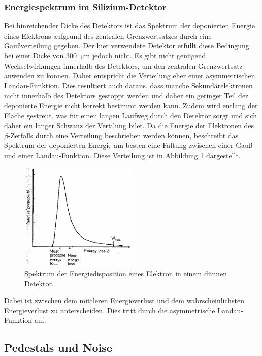 \subsubsection{Energiespektrum im Silizium-Detektor}
Bei hinreichender Dicke des Detektors ist das Spektrum der deponierten Energie eines
Elektrons aufgrund des zentralen Grenzwertsatzes durch eine Gaußverteilung gegeben.
Der hier verwendete Detektor erfüllt diese Bedingung bei einer Dicke von
\SI{300}{\micro\meter} jedoch nicht. Es gibt nicht genügend Wechselwirkungen
innerhalb des Detektors, um den zentralen Grenzwertsatz anwenden zu können.
Daher entspricht die Verteilung eher einer asymmetrischen Landau-Funktion.
Dies resultiert auch daraus, dass manche
Sekundärelektronen nicht innerhalb des Detektors gestoppt werden und daher
ein geringer Teil der deponierte Energie nicht korrekt bestimmt werden kann. Zudem
wird entlang der Fläche gestreut, was für einen langen Laufweg durch den Detektor
sorgt und sich daher ein langer Schwanz der Vertilung bilet.
Da die Energie der Elektronen des $\beta$-Zerfalls durch eine Verteilung beschrieben
werden können, beschreibt das Spektrum der deponierten Energie am besten eine Faltung zwischen
einer Gauß- und einer Landau-Funktion. Diese Verteilung ist in Abbildung \ref{fig:faltung}
dargestellt.
\begin{figure}[htb]
  \centering
  \includegraphics[width=0.5\textwidth]{images/Landau.png}
  \caption{Spektrum der Energiedisposition eines Elektron in einem dünnen Detektor. \cite{anleitung}}
  \label{fig:faltung}
\end{figure}
Dabei ist zwischen dem mittleren Energieverlust und dem wahrscheinlichsten Energieverlust
zu unterscheiden. Dies tritt durch die asymmetrische Landau-Funktion auf.


\FloatBarrier
\subsection{Pedestals und Noise}
\label{sec:Theorie_Noise}

